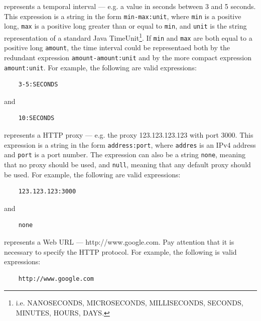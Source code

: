 \begin{description}
  \setlength\itemsep{1em}

  \item[time-expression] represents a temporal interval — e.g. a value in seconds between 3 and 5 seconds. This expression is a string in the form \texttt{min-max:unit}, where \texttt{min} is a positive long, \texttt{max} is a positive long greater than or equal to \texttt{min}, and \texttt{unit} is the string representation of a standard Java TimeUnit\footnote{i.e. NANOSECONDS, MICROSECONDS, MILLISECONDS, SECONDS, MINUTES, HOURS, DAYS.}. If \texttt{min} and \texttt{max} are both equal to a positive long \texttt{amount}, the time interval could be representaed both by the redundant expression \texttt{amount-amount:unit} and by the more compact expression \texttt{amount:unit}.
  For example, the following are valid expressions:

  \begin{verbatim}
    3-5:SECONDS
  \end{verbatim}

  and

  \begin{verbatim}
    10:SECONDS
  \end{verbatim}

  \item[proxy-expression] represents a HTTP proxy — e.g. the proxy 123.123.123.123 with port 3000. This expression is a string in the form \texttt{address:port}, where \texttt{addres} is an IPv4 address and \texttt{port} is a port number. The expression can also be a string \texttt{none}, meaning that no proxy should be used, and \texttt{null}, meaning that any default proxy should be used.
  For example, the following are valid expressions:

  \begin{verbatim}
    123.123.123:3000
  \end{verbatim}

  and

  \begin{verbatim}
    none
  \end{verbatim}

  \item[web-expression] represents a Web URL — http://www.google.com. Pay attention that it is necessary to specify the HTTP protocol.
  For example, the following is valid expressions:

  \begin{verbatim}
    http://www.google.com
  \end{verbatim}


\end{description}
